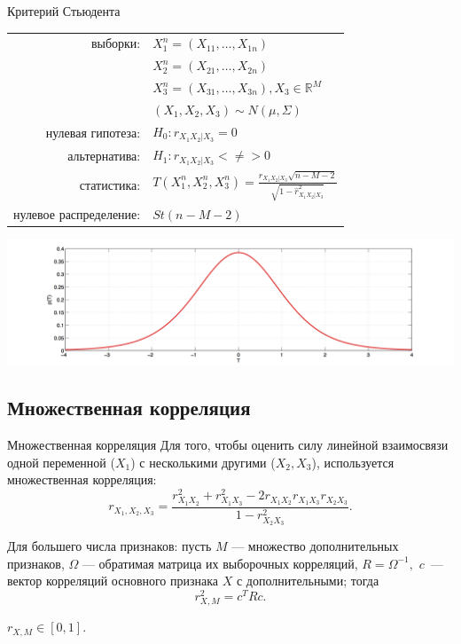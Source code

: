 \documentclass[9pt,pdf,utf8,hyperref={unicode},aspectratio=169]{beamer}
\begin{document}
\begin{frame}{Критерий Стьюдента}
	\begin{center}
		\begin{tabular}{rl}
			выборки:                        & $X_1^n=\left(X_{11},\ldots,X_{1n}\right)$ \\
			                                & $X_2^n=\left(X_{21},\ldots,X_{2n}\right)$\\
			                                & $X_3^n=\left(X_{31},\ldots,X_{3n}\right), X_{3} \in \mathbb{R}^M$\\
		  	                                & $\left(X_{1},X_{2},X_{3}\right)\sim N\left(\mu,\Sigma\right)$ \\
			нулевая гипотеза:               & $H_0\colon r_{X_1X_2|X_3}=0$ \\
			альтернатива:                   & $H_1\colon r_{X_1X_2|X_3}<\neq>0$ \\
			статистика:                     & $T\left(X_1^n, X_2^n, X_3^n\right) = \frac{\hat{r}_{X_1X_2|X_3} \sqrt{n-M-2}}{\sqrt{1-\hat{r}_{X_1X_2|X_3}^2}}$ \\
			нулевое распределение:          & $St(n-M-2)$\\
		\end{tabular}
		\includegraphics[width=\textwidth]{stud.png}
	\end{center}
\end{frame}

\subsection{Множественная корреляция}
\begin{frame}{Множественная корреляция}
	Для того, чтобы оценить силу линейной взаимосвязи одной переменной ($X_1$) с несколькими другими ($X_2,X_3$), используется множественная корреляция:
	$$r_{X_1,X_2,X_3} = \frac{r_{X_1X_2}^2 + r_{X_1X_3}^2 - 2r_{X_1X_2}r_{X_1X_3}r_{X_2X_3}}{1-r_{X_2X_3}^2}.$$
	
	Для большего числа признаков: пусть $M$ --- множество дополнительных признаков, $\Omega$ --- обратимая матрица их выборочных корреляций, $R=\Omega^{-1},$ $c$~--- вектор корреляций основного признака $X$ с дополнительными; тогда
	$$r_{X,M}^2 = c^T Rc.$$
	
	\bigskip
	
	
	\bigskip
	
	$r_{X,M}\in[0,1].$
\end{frame}
\end{document}
